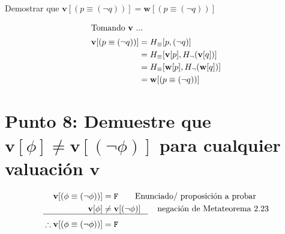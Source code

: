 \documentclass{article}
\begin{document}
Demostrar que $\mathbf{v}[(p \equiv (\lnot q))] = \mathbf{w}[(p \equiv (\lnot q))]$

\begin{alignat*}{2}
    \intertext{Tomando $\mathbf{v}$ ...}
    \mathbf{v}[(p \equiv (\lnot q))] &= H_{\equiv}[p, (\lnot q)]\\
    &= H_{\equiv}[\mathbf{v}[p], H_{\lnot}(\mathbf{v}[q])]\\
    &= H_{\equiv}[\mathbf{w}[p], H_{\lnot}(\mathbf{w}[q])]\\
    &= \mathbf{w}[(p \equiv (\lnot q))]
\end{alignat*}

\section{Punto 8: Demuestre que $\mathbf{v}[\phi] \not= \mathbf{v}[(\lnot \phi)]$ para cualquier valuación $\mathbf{v}$}

\begin{alignat*}{2}
    \mathbf{v}[(\phi \equiv (\lnot \phi))] &= \mathtt{F} \tag*{Enunciado/ proposición a probar}\\
    \mathbf{v}[\phi] &\not= \mathbf{v}[(\lnot \phi)] \tag*{negación de Metateorema 2.23}\\[-.4cm]
    \makebox[2.5cm]{\hrulefill}&\makebox[1.9cm]{\hrulefill}\\
    \therefore \mathbf{v}[(\phi \equiv (\lnot \phi))] &= \mathtt{F}
\end{alignat*}
\end{document}

